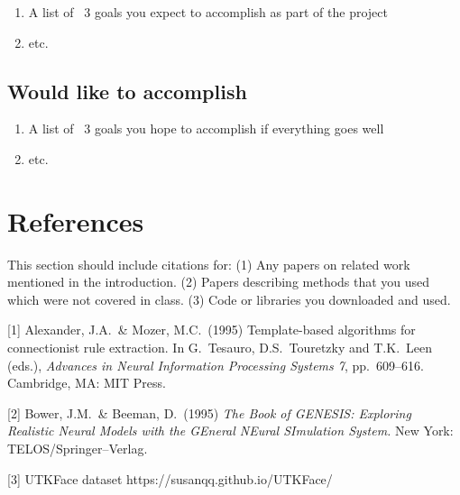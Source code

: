 \documentclass{article}
\begin{document}
\begin{enumerate}
    \item A list of ~3 goals you expect to accomplish as part of the project
    \item etc.
\end{enumerate}

\subsection{Would like to accomplish}

\begin{enumerate}
    \item A list of ~3 goals you hope to accomplish if everything goes well
    \item etc.
\end{enumerate}

\section*{References}
This section should include citations for: (1) Any papers on related work mentioned in the introduction.
(2) Papers describing methods that you used which were not covered in class.
(3) Code or libraries you downloaded and used.

\medskip
\small
[1] Alexander, J.A.\ \& Mozer, M.C.\ (1995) Template-based algorithms
for connectionist rule extraction. In G.\ Tesauro, D.S.\ Touretzky and
T.K.\ Leen (eds.), {\it Advances in Neural Information Processing
  Systems 7}, pp.\ 609--616. Cambridge, MA: MIT Press.

[2] Bower, J.M.\ \& Beeman, D.\ (1995) {\it The Book of GENESIS:
  Exploring Realistic Neural Models with the GEneral NEural SImulation
  System.}  New York: TELOS/Springer--Verlag.

[3] UTKFace dataset https://susanqq.github.io/UTKFace/
\end{document}
